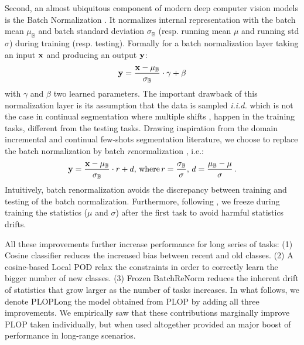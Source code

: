 Second, an almost ubiquitous component of modern deep computer vision models is the Batch
Normalization \citep{ioffe2015batchnorm}. It normalizes internal representation with the batch mean
$\mu_\mathbb{B}$ and batch standard deviation $\sigma_\mathbb{B}$ (resp. running mean $\mu$ and
running std $\sigma$) during training (resp. testing). Formally for a batch normalization layer
taking an input $\mathbf{x}$ and producing an output $\mathbf{y}$:
%
\begin{equation}
    \mathbf{y} = \frac{\mathbf{x} - \mu_\mathbb{B}}{\sigma_\mathbb{B}} \cdot \gamma + \beta
    \label{eq:seg_batch_norm}
\end{equation}
%
with $\gamma$ and $\beta$ two learned parameters. The important drawback of this normalization layer
is its assumption that the data is sampled \textit{i.i.d.} which is not the case in continual
segmentation where multiple shifts \citep{morenotorresa2012datasetshift,lesort2021driftanalysis},
happen in the training tasks, different from the testing tasks. Drawing inspiration from the domain
incremental \citep{lomonaco2020ar1} and continual few-shots segmentation
\citep{cermelli2020fewshotcontinualsegm} literature, we choose to replace the batch normalization by
batch \textit{re}normalization \citep{ioffe2017batchrenorm}, i.e.:
%
\begin{equation}
    \mathbf{y} = \frac{\mathbf{x} - \mu_\mathbb{B}}{\sigma_\mathbb{B}} \cdot r + d,\,\text{where}\, r = \frac{\sigma_\mathbb{B}}{\sigma},\, d = \frac{\mu_\mathbb{B} - \mu}{\sigma}\,.
    \label{eq:seg_batch_renorm}
\end{equation}
%
Intuitively, batch renormalization avoids the discrepancy between training and testing of the batch
normalization. Furthermore, following \citet{cermelli2020fewshotcontinualsegm}, we freeze during
training the statistics ($\mu$ and $\sigma$) after the first task to avoid harmful statistics
drifts.

All these improvements further increase performance for long series of tasks: (1) Cosine classifier
reduces the increased bias between recent and old classes. (2) A cosine-based Local POD relax the
constraints in order to correctly learn the bigger number of new classes. (3) Frozen BatchReNorm
reduces the inherent drift of statistics that grow larger as the number of tasks increases. In what
follows, we denote PLOPLong the model obtained from PLOP by adding all three improvements. We
empirically saw that these contributions marginally improve PLOP taken individually, but when used
altogether provided an major boost of performance in long-range scenarios.



